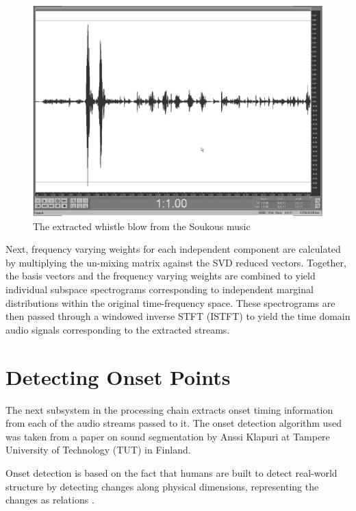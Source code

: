 \begin{landscape}
  \begin{figure}
    \centering
    \includegraphics[width=7in]{ZingZongExtractedWhistle.pdf}
    \caption{The extracted whistle blow from the Soukous music}
    \label{zingzongwhistle}
  \end{figure}
\end{landscape}

Next, frequency varying weights for each independent component are 
calculated by multiplying the un-mixing matrix against the SVD reduced
vectors. Together, the basis vectors and the frequency varying weights
are combined to yield individual subspace spectrograms corresponding
to independent marginal distributions within the original
time-frequency space. These spectrograms are then passed through a 
windowed inverse STFT (ISTFT) to yield the time domain audio signals 
corresponding to the extracted streams. 

\vspace{7mm}
\section{Detecting Onset Points}
\vspace{3mm}

The next subsystem in the processing chain extracts onset timing
information from each of the audio streams passed to it. The onset detection
algorithm used was taken from a paper on sound segmentation by 
Anssi Klapuri \cite{Klapuri:99} at Tampere University of Technology 
(TUT) in Finland.

Onset detection is based on the fact that humans are built to detect real-world
structure by detecting changes along physical dimensions, representing
the changes as relations \cite{Jones:76}.


